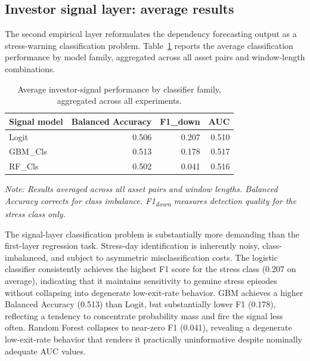 \subsection{Investor signal layer: average results}

The second empirical layer reformulates the dependency forecasting output as a stress-warning classification problem. Table~\ref{tab:signal_summary} reports the average classification performance by model family, aggregated across all asset pairs and window-length combinations.

\begin{table}[H]
    \centering
    \caption{Average investor-signal performance by classifier family, aggregated across all experiments.}
    \label{tab:signal_summary}
    \begin{tabular}{lrrr}
        \toprule
        Signal model & Balanced Accuracy & F1\_down & AUC \\
        \midrule
        Logit & 0.506 & 0.207 & 0.510 \\
        GBM\_Cls & 0.513 & 0.178 & 0.517 \\
        RF\_Cls & 0.502 & 0.041 & 0.516 \\
        \bottomrule
    \end{tabular}
    \par\smallskip\noindent\footnotesize{\textit{Note: Results averaged across all asset pairs and window lengths. Balanced Accuracy corrects for class imbalance. F1\textsubscript{down} measures detection quality for the stress class only.}}
\end{table}

The signal-layer classification problem is substantially more demanding than the first-layer regression task. Stress-day identification is inherently noisy, class-imbalanced, and subject to asymmetric misclassification costs. The logistic classifier consistently achieves the highest F1 score for the stress class (0.207 on average), indicating that it maintains sensitivity to genuine stress episodes without collapsing into degenerate low-exit-rate behavior. GBM achieves a higher Balanced Accuracy (0.513) than Logit, but substantially lower F1 (0.178), reflecting a tendency to concentrate probability mass and fire the signal less often. Random Forest collapses to near-zero F1 (0.041), revealing a degenerate low-exit-rate behavior that renders it practically uninformative despite nominally adequate AUC values.

